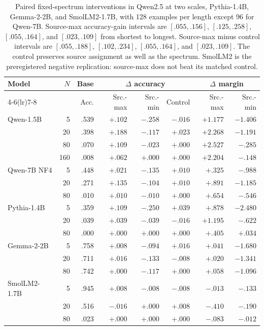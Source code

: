 \documentclass[letterpaper]{article} %
\begin{document}
\begin{table}[t]
\centering
\small
\begin{tabular}{lrrrrrrr}
\toprule
Model & $N$ & Base & \multicolumn{3}{c}{$\Delta$ accuracy} & \multicolumn{2}{c}{$\Delta$ margin} \\
\cmidrule(lr){4-6}\cmidrule(lr){7-8}
& & Acc. & Src.-max & Src.-min & Control & Src.-max & Src.-min \\
\midrule
Qwen-1.5B & 5   & .539 & $+.102$ & $-.258$ & $-.016$ & $+1.177$ & $-1.406$ \\
& 20  & .398 & $+.188$ & $-.117$ & $+.023$ & $+2.268$ & $-1.191$ \\
& 80  & .070 & $+.109$ & $-.023$ & $+.000$ & $+2.527$ & $-.285$ \\
& 160 & .008 & $+.062$ & $+.000$ & $+.000$ & $+2.204$ & $-.148$ \\
\midrule
Qwen-7B NF4 & 5  & .448 & $+.021$ & $-.135$ & $+.010$ & $+.325$ & $-.988$ \\
& 20 & .271 & $+.135$ & $-.104$ & $+.010$ & $+.891$ & $-1.185$ \\
& 80 & .010 & $+.010$ & $-.010$ & $+.000$ & $+.654$ & $-.546$ \\
\midrule
Pythia-1.4B & 5  & .359 & $+.109$ & $-.250$ & $+.039$ & $+.878$ & $-2.480$ \\
& 20 & .039 & $+.039$ & $-.039$ & $-.016$ & $+1.195$ & $-.622$ \\
& 80 & .000 & $+.000$ & $+.000$ & $+.000$ & $+.405$ & $+.034$ \\
\midrule
Gemma-2-2B & 5  & .758 & $+.008$ & $-.094$ & $+.016$ & $+.041$ & $-1.680$ \\
& 20 & .711 & $+.016$ & $-.133$ & $-.008$ & $+.020$ & $-1.341$ \\
& 80 & .742 & $+.000$ & $-.117$ & $+.000$ & $+.058$ & $-1.096$ \\
\midrule
SmolLM2-1.7B & 5  & .945 & $+.008$ & $-.008$ & $-.008$ & $-.013$ & $-.133$ \\
& 20 & .516 & $-.016$ & $+.000$ & $+.008$ & $-.410$ & $-.190$ \\
& 80 & .023 & $+.000$ & $+.000$ & $+.000$ & $-.083$ & $-.012$ \\
\bottomrule
\end{tabular}
\caption{Paired fixed-spectrum interventions in Qwen2.5 at two scales, Pythia-1.4B, Gemma-2-2B, and
SmolLM2-1.7B, with
128 examples per length except 96 for Qwen-7B.
Source-max accuracy-gain intervals are $[.055,.156]$, $[.125,.258]$, $[.055,.164]$, and $[.023,.109]$
from shortest to longest. Source-max minus control intervals are $[.055,.188]$, $[.102,.234]$,
$[.055,.164]$, and $[.023,.109]$. The control preserves source assignment as well as the spectrum.
SmolLM2 is the preregistered negative replication: source-max does not beat its matched control.}
\label{tab:pretrained-causal}
\end{table}
\end{document}
